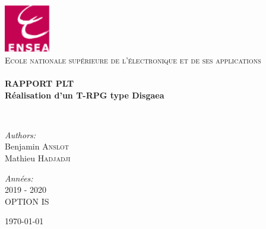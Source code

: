 \begin{titlepage}
\begin{center}

\includegraphics[width=0.15\textwidth]{./logo-ensea}~\\[1cm]

\textsc{\Large  Ecole nationale supérieure de l'électronique et de ses applications}\\[0.5cm]

\HRule \\[0.4cm]

{\huge \bfseries RAPPORT PLT\\
Réalisation d'un T-RPG type Disgaea   \\[0.4cm] }

\HRule \\[1.5cm]

\begin{minipage}{0.4\textwidth}
\begin{flushleft} \large
\emph{Authors:}\\
Benjamin \textsc{Anslot}\\
Mathieu \textsc{Hadjadji}
\end{flushleft}
\end{minipage}
\begin{minipage}{0.4\textwidth}
\begin{flushright} \large


\emph{Années:} \\
2019 - 2020 \\
OPTION IS \\
\end{flushright}
\end{minipage}

\vfill

{\large \today}

\end{center}
\end{titlepage}